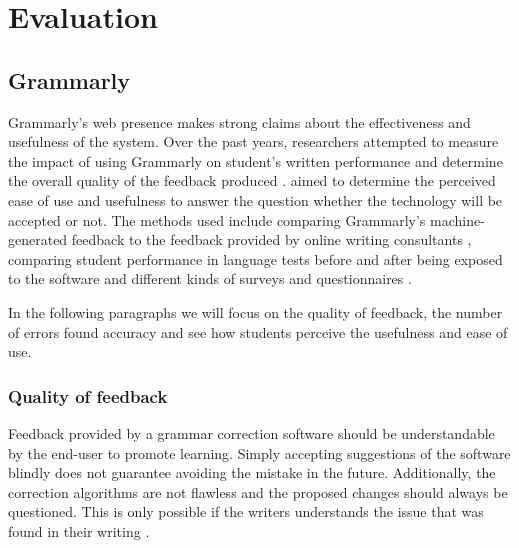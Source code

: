 \documentclass[runningheads]{llncs}
\let\OldTextregistered\textregistered
\renewcommand{\textregistered}{\OldTextregistered\xspace}
\begin{document}
\section{Evaluation}

\subsection{Grammarly\textregistered}
Grammarly\textregistered's web presence \citep{noauthor_grammarly_nodate} makes strong claims about the effectiveness and usefulness of the system. Over the past years, researchers attempted to measure the impact of using Grammarly\textregistered on student's written performance and determine the overall quality of the feedback produced \citep{dembsey_closing_2017,nova_utilizing_2018,ventayen_graduate_2018}. \textcite{cavaleri_you_2016} aimed to determine the perceived ease of use and usefulness to answer the question whether the technology will be accepted or not. The methods used include comparing Grammarly\textregistered's machine-generated feedback to the feedback provided by online writing consultants \citep{dembsey_closing_2017}, comparing student performance in language tests before and after being exposed to the software \citep{qassemzadeh_impact_2016} and different kinds of surveys and questionnaires \citep{nova_utilizing_2018, cavaleri_you_2016, ventayen_graduate_2018}.

In the following paragraphs we will focus on the quality of feedback, the number of errors found accuracy and see how students perceive the usefulness and ease of use.

\subsubsection{Quality of feedback}
Feedback provided by a grammar correction software should be understandable by the end-user to promote learning. Simply accepting suggestions of the software blindly does not guarantee avoiding the mistake in the future. Additionally, the correction algorithms are not flawless and the proposed changes should always be questioned. This is only possible if the writers understands the issue that was found in their writing \citep{dembsey_closing_2017}.
\end{document}
